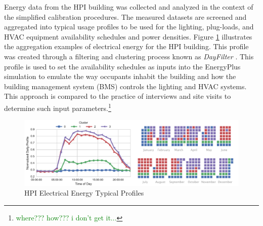 \documentclass{tBPS2e}
\theoremstyle{plain}
\theoremstyle{definition}
\theoremstyle{remark}
\newcommand{\noteDT}[1]{\footnote{\textcolor{green}{#1}}}
\begin{document}
Energy data from the HPI building was collected and analyzed in the context of the simplified calibration procedures. The measured datasets are screened and aggregated into typical usage profiles to be used for the lighting, plug-loads, and HVAC equipment availability schedules and power densities. Figure \ref{fig:hpi_elec_profiles} illustrates the aggregation examples of electrical energy for the HPI building. This profile was created through a filtering and clustering process known as \emph{DayFilter} \citep{Miller:2015kr}. This profile is used to set the availability schedules as inputs into the EnergyPlus simulation to emulate the way occupants inhabit the building and how the building management system (BMS) controls the lighting and HVAC systems. This approach is compared to the practice of interviews and site visits to determine such input parameters.\noteDT{where??? how??? i don't get it...}

\begin{figure}[H]
\centering
\includegraphics[scale=0.55]{figures/HPI_combinedclusterandcal_5}
\caption{HPI Electrical Energy Typical Profiles}
\label{fig:hpi_elec_profiles}
\end{figure}
\end{document}
